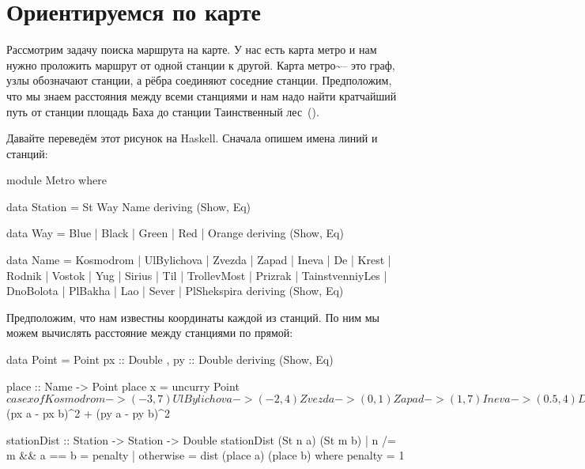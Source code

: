 \chapter{Ориентируемся по карте}

Рассмотрим задачу поиска маршрута на карте. У нас есть карта метро и нам
нужно проложить маршрут от одной станции к другой. Карта
метро\textasciitilde{}-- это граф, узлы обозначают станции, а рёбра
соединяют соседние станции. Предположим, что мы знаем расстояния между
всеми станциями и нам надо найти кратчайший путь от станции площадь Баха
до станции Таинственный лес~().


Давайте переведём этот рисунок на Haskell. Сначала опишем имена линий и
станций:


\begin{code}
module Metro where

data Station = St Way Name
    deriving (Show, Eq)

data Way = Blue | Black | Green | Red | Orange
    deriving (Show, Eq)

data Name = Kosmodrom | UlBylichova | Zvezda 
          | Zapad | Ineva | De | Krest | Rodnik | Vostok 
          | Yug | Sirius | Til | TrollevMost | Prizrak | TainstvenniyLes 
          | DnoBolota | PlBakha | Lao | Sever
          | PlShekspira
    deriving (Show, Eq)
\end{code}

Предположим, что нам известны координаты каждой из станций. По ним мы
можем вычислять расстояние между станциями по прямой:


\begin{code}
data Point = Point 
    { px :: Double
    , py :: Double
    } deriving (Show, Eq)

place :: Name -> Point
place x = uncurry Point $ case x of
    Kosmodrom           -> (-3,7)
    UlBylichova         -> (-2,4) 
    Zvezda              -> (0,1)
    Zapad               -> (1,7)
    Ineva               -> (0.5, 4)
    De                  -> (0,-1)
    Krest               -> (0,-3)
    Rodnik              -> (0,-5)
    Vostok              -> (-1,-7)
    Yug                 -> (-7,-1)
    Sirius              -> (-3,0)
    Til                 -> (3,2)
    TrollevMost         -> (5,4)
    Prizrak             -> (8,6)
    TainstvenniyLes     -> (11,7)
    DnoBolota           -> (-7,-4)
    PlBakha             -> (-3,-3)
    Lao                 -> (3.5,0)
    Sever               -> (6,1)
    PlShekspira         -> (3,-3)


dist :: Point -> Point -> Double
dist a b = sqrt $ (px a - px b)^2 + (py a - py b)^2

stationDist :: Station -> Station -> Double
stationDist (St n a) (St m b)
    | n /= m && a == b  = penalty
    | otherwise         = dist (place a) (place b)
    where penalty = 1
\end{code}

